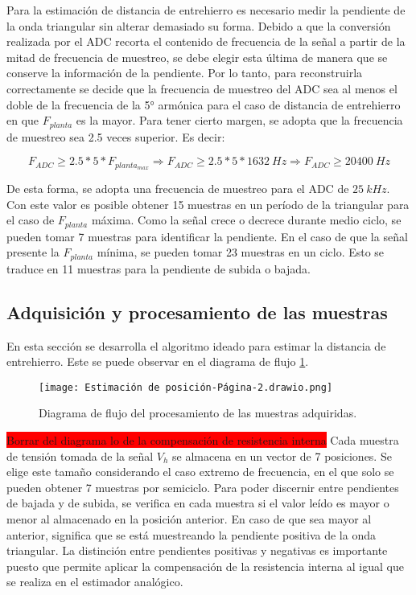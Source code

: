  Para la estimación de distancia de entrehierro es necesario medir la pendiente de la onda triangular sin alterar demasiado su forma. Debido a que la conversión realizada por el ADC recorta el contenido de frecuencia de la señal a partir de la mitad de frecuencia de muestreo, se debe elegir esta última de manera que se conserve la información de la pendiente.  Por lo tanto, para reconstruirla correctamente se decide que la frecuencia de muestreo del ADC sea al menos el doble de la frecuencia de la 5° armónica para el caso de distancia de entrehierro en que $F_{planta}$ es la mayor. Para tener cierto margen, se adopta que la frecuencia de muestreo sea 2.5 veces superior. Es decir:

\begin{equation} 
	F_{ADC} \geq 2.5 * 5 * F_{planta_{max}} \Rightarrow  F_{ADC} \geq 2.5 * 5 * 1632\:Hz \Rightarrow F_{ADC} \geq 20400\:Hz
\end{equation}


 De esta forma, se adopta una frecuencia de muestreo para el ADC de  $25\:kHz$. Con este valor es posible obtener 15 muestras en un período de la triangular para el caso de $F_{planta}$ máxima. Como la señal crece o decrece durante medio ciclo, se pueden tomar 7 muestras para identificar la pendiente. En el caso de que la señal presente la $F_{planta}$ mínima, se pueden tomar 23 muestras en un ciclo. Esto se traduce en 11 muestras para la pendiente de subida o bajada. 


\subsection{Adquisición y procesamiento de las muestras} \label{sec_adquisicion_y_procesamiento}

En esta sección se desarrolla el algoritmo ideado para estimar la distancia de entrehierro. Este se puede observar en el diagrama de flujo \ref{fig:procesamiento-muestras-adquiridas}.


\begin{figure}[H]
	\centering
	\texttt{[image: Estimación de posición-Página-2.drawio.png]}
	\caption{ Diagrama de flujo del procesamiento de las muestras adquiridas.}
	\label{fig:procesamiento-muestras-adquiridas}
\end{figure}

\colorbox{red}{Borrar del diagrama lo de la compensación de resistencia interna}
Cada muestra de tensión tomada de la señal $V_h$ se almacena en un vector de 7 posiciones. Se elige este tamaño considerando el caso extremo de frecuencia, en el que solo se pueden obtener 7 muestras por semiciclo. Para poder discernir entre pendientes de bajada y de subida, se verifica en cada muestra si el valor leído es mayor o menor al almacenado en la posición anterior. En caso de que sea mayor al anterior, significa que se está muestreando la pendiente positiva de la onda triangular. La distinción entre pendientes positivas y negativas es importante puesto que permite aplicar la compensación de la resistencia interna al igual que se realiza en el estimador analógico. 

